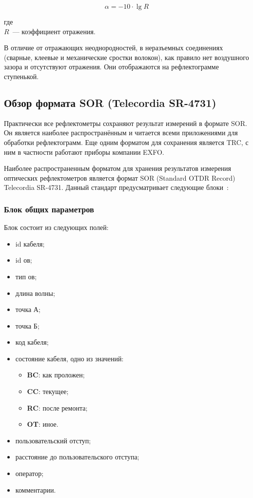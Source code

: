 \begin{equation}
  \label{eqn:refl_loss}
  \alpha=-10\cdot \lg R
\end{equation}

\noindent где \\
$R$~--- коэффициент отражения.

В отличие от отражающих неоднородностей, в неразъемных соединениях (сварные, клеевые и механические сростки волокон), как правило нет воздушного зазора и отсутствуют отражения. Они отображаются на рефлектограмме ступенькой.

\subsection{Обзор формата SOR (Telecordia SR-4731)}

Практически все рефлектометры сохраняют результат измерений в формате SOR. Он является наиболее распространённым и читается всеми приложениями для обработки рефлектограмм. Еще одним форматом для сохранения является TRC, с ним в частности работают приборы компании EXFO.~\cite{web:volsexpert_reflectometria}

Наиболее распространенным форматом для хранения результатов измерения оптических рефлектометров является формат SOR (Standard OTDR Record) Telecordia SR-4731. Данный стандарт предусматривает следующие блоки~\cite{web:otdr_format}:

\subsubsection{Блок общих параметров}

Блок состоит из следующих полей:
\begin{itemize}
  \item id кабеля;
  \item id \acrshort{ов};
  \item тип \acrshort{ов};
  \item длина волны;
  \item точка А;
  \item точка Б;
  \item код кабеля;
  \item состояние кабеля, одно из значений:
  \begin{itemize}
    \item \textbf{BC}: как проложен;
    \item \textbf{CC}: текущее;
    \item \textbf{RC}: после ремонта;
    \item \textbf{OT}: иное.
  \end{itemize}
  \item пользовательский отступ;
  \item расстояние до пользовательского отступа;
  \item оператор;
  \item комментарии.
\end{itemize}


